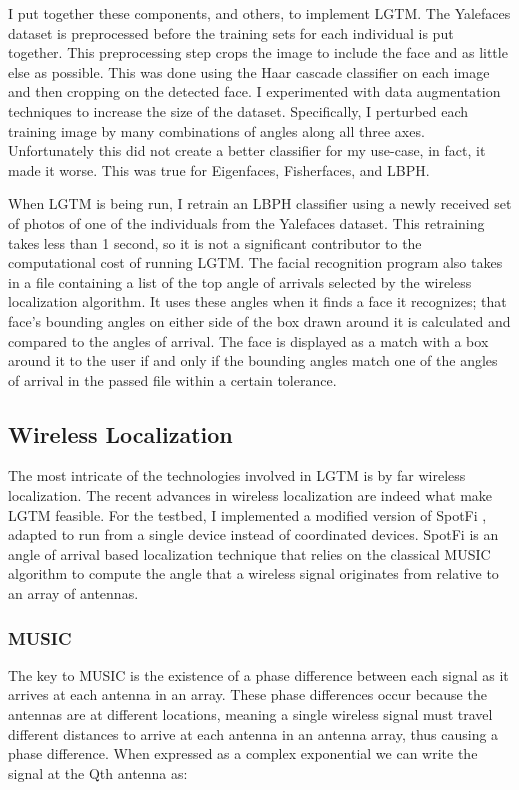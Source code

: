 \documentclass[12pt]{report}
\begin{document}
I put together these components, and others, to implement LGTM. The Yalefaces dataset is preprocessed before the training sets for each individual is put together. This preprocessing step crops the image to include the face and as little else as possible. This was done using the Haar cascade classifier on each image and then cropping on the detected face. I experimented with data augmentation techniques to increase the size of the dataset. Specifically, I perturbed each training image by many combinations of angles along all three axes. Unfortunately this did not create a better classifier for my use-case, in fact, it made it worse. This was true for Eigenfaces, Fisherfaces, and LBPH. \par

When LGTM is being run, I retrain an LBPH classifier using a newly received set of photos of one of the individuals from the Yalefaces dataset. This retraining takes less than 1 second, so it is not a significant contributor to the computational cost of running LGTM. The facial recognition program also takes in a file containing a list of the top angle of arrivals selected by the wireless localization algorithm. It uses these angles when it finds a face it recognizes; that face's bounding angles on either side of the box drawn around it is calculated and compared to the angles of arrival. The face is displayed as a match with a box around it to the user if and only if the bounding angles match one of the angles of arrival in the passed file within a certain tolerance. \par

\subsection{Wireless Localization}
The most intricate of the technologies involved in LGTM is by far wireless localization. The recent advances in wireless localization \cite{UbicarseKumar2014,SpotFiKotaru2015,ChronosSingleAPLocalizationVasisht2016} are indeed what make LGTM feasible. For the testbed, I implemented a modified version of SpotFi \cite{SpotFiKotaru2015}, adapted to run from a single device instead of coordinated devices. SpotFi is an angle of arrival based localization technique that relies on the classical MUSIC algorithm \cite{MUSICSchmidt1986} to compute the angle that a wireless signal originates from relative to an array of antennas. 

\subsubsection{MUSIC}
The key to MUSIC is the existence of a phase difference between each signal as it arrives at each antenna in an array. These phase differences occur because the antennas are at different locations, meaning a single wireless signal must travel different distances to arrive at each antenna in an antenna array, thus causing a phase difference. When expressed as a complex exponential we can write the signal at the Qth antenna as:
\end{document}
